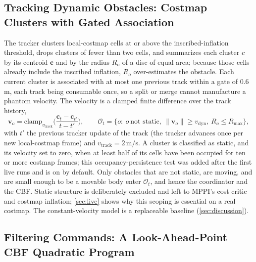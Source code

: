 \subsection{Tracking Dynamic Obstacles: Costmap Clusters with Gated Association}\label{sec:track}

The tracker clusters local-costmap cells at or above the inscribed-inflation threshold, drops clusters of fewer than two cells, and summarizes each cluster $c$ by its centroid $\mathbf{c}$ and by the radius $R_o$ of a disc of equal area; because those cells already include the inscribed inflation, $R_o$ over-estimates the obstacle. Each current cluster is associated with at most one previous track within a gate of $0.6$\,m, each track being consumable once, so a split or merge cannot manufacture a phantom velocity. The velocity is a clamped finite difference over the track history,
\begin{equation}\label{eq:track}
\mathbf{v}_o=\mathrm{clamp}_{v_{\mathrm{track}}}\!\Big(\frac{\mathbf{c}_{t}-\mathbf{c}_{t'}}{t-t'}\Big),\qquad
\mathcal{O}_t=\big\{o:\ o\ \text{not static},\ \|\mathbf{v}_o\|\ge v_{\mathrm{dyn}},\ R_o\le R_{\max}\big\},
\end{equation}
with $t'$ the previous tracker update of the track (the tracker advances once per new local-costmap frame) and $v_{\mathrm{track}}=2$\,m/s. A cluster is classified as static, and its velocity set to zero, when at least half of its cells have been occupied for ten or more costmap frames; this occupancy-persistence test was added after the first live runs and is on by default. Only obstacles that are not static, are moving, and are small enough to be a movable body enter $\mathcal{O}_t$, and hence the coordinator and the CBF. Static structure is deliberately excluded and left to MPPI's cost critic and costmap inflation; \cref{sec:live} shows why this scoping is essential on a real costmap. The constant-velocity model is a replaceable baseline (\cref{sec:discussion}).

\subsection{Filtering Commands: A Look-Ahead-Point CBF Quadratic Program}\label{sec:cbf}

